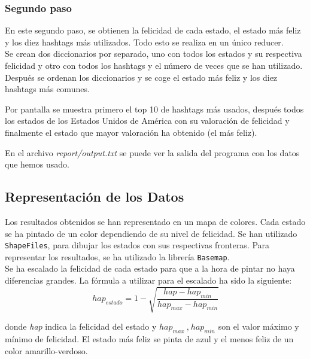 \documentclass[12pt,a4paper]{article}
\begin{document}
\begin{itemize}
\subsubsection{Segundo paso}

En este segundo paso, se obtienen  la felicidad de cada estado, el estado más feliz y los diez hashtags más utilizados. Todo esto se realiza en un único reducer.\\

Se crean dos diccionarios por separado, uno con todos los estados y su respectiva felicidad y otro con todos los hashtags y el número de veces que se han utilizado. Después se ordenan los diccionarios y se coge el estado más feliz y los diez hashtags más comunes.

Por pantalla se muestra primero el top 10 de hashtags más usados, después todos los estados de los Estados Unidos de América con su valoración de felicidad y finalmente el estado que mayor valoración ha obtenido (el más feliz).

En el archivo \textit{report/output.txt} se puede ver la salida del programa con los datos que hemos usado.
\end{itemize}

\subsection{Representación de los Datos}
Los resultados obtenidos se han representado en un mapa de colores. Cada estado se ha pintado de un color dependiendo de su nivel de felicidad. Se han utilizado \texttt{ShapeFiles}, para dibujar los estados con sus respectivas fronteras. Para representar los resultados, se ha utilizado la librería \texttt{Basemap}.\\

Se ha escalado la felicidad de cada estado para que a la hora de pintar no haya diferencias grandes. La fórmula a utilizar para el escalado ha sido la siguiente:
$$hap_{estado}=1-\displaystyle \sqrt{\dfrac{hap-hap_{min}}{hap_{max}-hap_{min}}}$$

donde \textit{hap} indica la felicidad del estado y $hap_{max}\ \text{,}\ hap_{min}$ son el valor máximo y mínimo de felicidad.
El estado más feliz se pinta de azul y el menos feliz de un color amarillo-verdoso.

\end{document}
